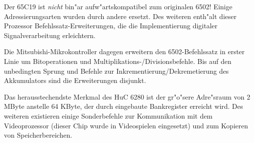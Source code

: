 \documentclass[12pt,a4paper,twoside]{report}
\begin{document}
Der 65C19 ist {\em nicht} bin"ar aufw"artskompatibel zum
originalen 6502!  Einige Adressierungsarten wurden durch andere
ersetzt.  Des weiteren enth"alt dieser Prozessor
Befehlssatz-Erweiterungen, die die Implementierung digitaler
Signalverarbeitung erleichtern.

Die Mitsubishi-Mikrokontroller dagegen erweitern den
6502-Befehlssatz in erster Linie um Bitoperationen und
Multiplikations-/Divisionsbefehle.  Bis auf den unbedingten Sprung und
Befehle zur Inkrementierung/Dekremetierung des Akkumulators sind die
Erweiterungen disjunkt.

Das herausstechendste Merkmal des HuC 6280 ist der gr"o"sere
Adre"sraum von 2 MByte anstelle 64 KByte, der durch eingebaute
Bankregister erreicht wird.   Des weiteren existieren einige
Sonderbefehle zur Kommunikation mit dem Videoprozessor (dieser
Chip wurde in Videospielen eingesetzt) und zum Kopieren von
Speicherbereichen.
\end{document}
